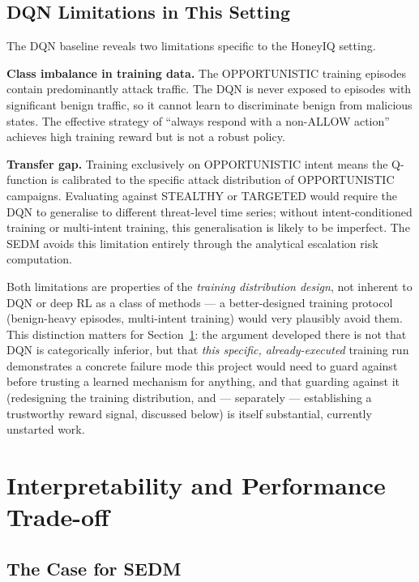 \subsection{DQN Limitations in This Setting}

The DQN baseline reveals two limitations specific to the HoneyIQ setting.

\textbf{Class imbalance in training data.}
The OPPORTUNISTIC training episodes contain predominantly attack traffic.
The DQN is never exposed to episodes with significant benign traffic,
so it cannot learn to discriminate benign from malicious states.
The effective strategy of ``always respond with a non-ALLOW action'' achieves
high training reward but is not a robust policy.

\textbf{Transfer gap.}
Training exclusively on OPPORTUNISTIC intent means the Q-function is
calibrated to the specific attack distribution of OPPORTUNISTIC campaigns.
Evaluating against STEALTHY or TARGETED would require the DQN to generalise
to different threat-level time series; without intent-conditioned training
or multi-intent training, this generalisation is likely to be imperfect.
The SEDM avoids this limitation entirely through the analytical escalation
risk computation.

Both limitations are properties of the \emph{training distribution design},
not inherent to DQN or deep RL as a class of methods --- a better-designed
training protocol (benign-heavy episodes, multi-intent training) would very
plausibly avoid them.
This distinction matters for Section~\ref{sec:disc_tradeoff}: the argument
developed there is not that DQN is categorically inferior, but that
\emph{this specific, already-executed} training run demonstrates a concrete
failure mode this project would need to guard against before trusting a
learned mechanism for anything, and that guarding against it (redesigning
the training distribution, and --- separately --- establishing a
trustworthy reward signal, discussed below) is itself substantial,
currently unstarted work.

\section{Interpretability and Performance Trade-off}
\label{sec:disc_tradeoff}

\subsection{The Case for SEDM}


